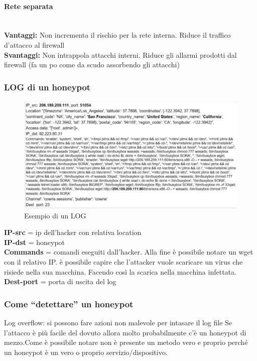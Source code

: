 \documentclass[8pt]{extarticle}
\begin{document}
\paragraph{Rete separata}
\noindent
\\
\textbf{Vantaggi:} Non incrementa il rischio per la rete interna. Riduce il traffico d’attacco al firewall\\
\textbf{Svantaggi:} Non intrappola attacchi interni. Riduce gli allarmi prodotti dal firewall (fa un po come 
da scudo assorbendo gli attacchi)
\subsubsection{LOG di un honeypot}
\begin{figure}[H]
    \center
    \includegraphics[scale=0.25]{images/HP2.png}
    \caption{Esempio di un LOG}\label{fig:1}
\end{figure}
\textbf{IP-src} = ip dell'hacker con relativa location \\
\textbf{IP-dst} = honeypot\\
\textbf{Commands} = comandi eseguiti dall’hacker. Alla fine è possibile notare un wget con il relativo IP.  
è possibile capire che l’attacker vuole scaricare un virus che risiede nella sua macchina. Facendo così la scarica nella macchina infettata.\\
\textbf{Dest-port} = porta di  uscita del log \\
\subsubsection{Come “detettare” un honeypot}
Log overflow: si possono fare azioni non malevole per intasare il log file
Se l’attacco è più facile del dovuto allora molto probabilmente c’è un honeypot di mezzo.Come è possibile notare non è presente un metodo 
vero e proprio perché un honeypot è un vero o proprio servizio/dispositivo. 
\end{document}
